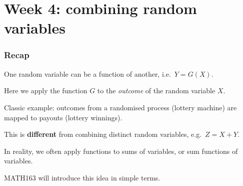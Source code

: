 \documentclass[t,8pt]{beamer}
\begin{document}

\section{Week 4: combining random variables}

\begin{frame}
	\frametitle{Recap}
	One random variable can be a function of another, i.e.\ $Y=G(X)$. \par
	Here we apply the function $G$ to the \emph{outcome} of the random variable $X$. \par
	Classic example: outcomes from a randomised process (lottery machine) are mapped to payouts (lottery winnings). \par
	This is {\bf different} from combining distinct random variables, e.g.\ $Z=X+Y$. \par
	In reality, we often apply functions to sums of variables, or sum functions of variables. \par
	MATH163 will introduce this idea in simple terms.
\end{frame}
\end{document}
